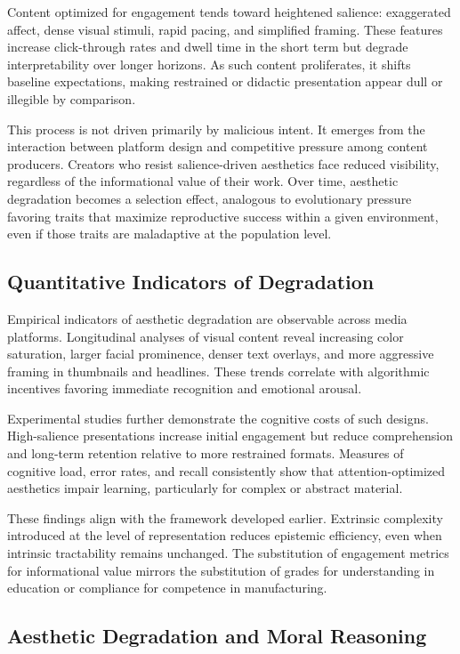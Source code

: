\documentclass[11pt]{article}
\begin{document}
Content optimized for engagement tends toward heightened salience: exaggerated affect, dense visual stimuli, rapid pacing, and simplified framing. These features increase click-through rates and dwell time in the short term but degrade interpretability over longer horizons. As such content proliferates, it shifts baseline expectations, making restrained or didactic presentation appear dull or illegible by comparison.

This process is not driven primarily by malicious intent. It emerges from the interaction between platform design and competitive pressure among content producers. Creators who resist salience-driven aesthetics face reduced visibility, regardless of the informational value of their work. Over time, aesthetic degradation becomes a selection effect, analogous to evolutionary pressure favoring traits that maximize reproductive success within a given environment, even if those traits are maladaptive at the population level.

\subsection{Quantitative Indicators of Degradation}

Empirical indicators of aesthetic degradation are observable across media platforms. Longitudinal analyses of visual content reveal increasing color saturation, larger facial prominence, denser text overlays, and more aggressive framing in thumbnails and headlines. These trends correlate with algorithmic incentives favoring immediate recognition and emotional arousal.

Experimental studies further demonstrate the cognitive costs of such designs. High-salience presentations increase initial engagement but reduce comprehension and long-term retention relative to more restrained formats. Measures of cognitive load, error rates, and recall consistently show that attention-optimized aesthetics impair learning, particularly for complex or abstract material.

These findings align with the framework developed earlier. Extrinsic complexity introduced at the level of representation reduces epistemic efficiency, even when intrinsic tractability remains unchanged. The substitution of engagement metrics for informational value mirrors the substitution of grades for understanding in education or compliance for competence in manufacturing.

\subsection{Aesthetic Degradation and Moral Reasoning}
\end{document}
